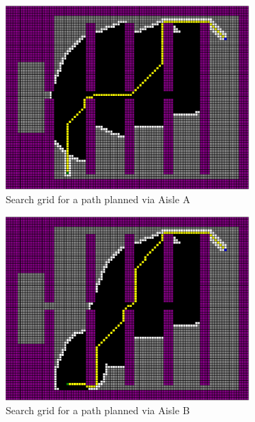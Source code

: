 \documentclass[a4paper,12pt]{article}
\begin{document}
		\begin{figure}[htp]
			\centering
			\begin{subfigure}{.45\textwidth}
				\centering
				\includegraphics[width=\textwidth]{../exports/initial_search_grid_aisleA}
				\caption{Search grid for a path planned via Aisle A}
				\label{fig:searchGridAisleA}
			\end{subfigure}
			\begin{subfigure}{.45\textwidth}
				\centering
				\includegraphics[width=\textwidth]{../exports/initial_search_grid_aisleB}
				\caption{Search grid for a path planned via Aisle B}
				\label{fig:searchGridAisleB}
			\end{subfigure}
			\begin{subfigure}{.45\textwidth}

\end{subfigure}
\end{figure}
\end{document}
